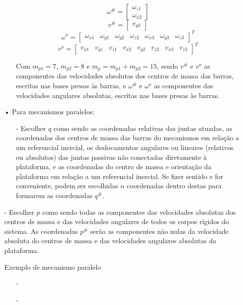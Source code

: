 \documentclass[12pt,a4paper]{article}
\begin{document}
\begin{itemize}
\begin{itemize}
$$ \omega^{\#} = \begin{bmatrix}
\omega_{z1} \\
\omega_{x2}
\end{bmatrix} $$
$$ v^{\#} = \begin{bmatrix}
v_{y3}
\end{bmatrix} $$
$$ \omega^o = \begin{bmatrix}
\omega_{x1} & \omega_{y1} & \omega_{y2} & \omega_{z2} & \omega_{x3} & \omega_{y3} & \omega_{z3}
\end{bmatrix}^T $$
$$ v^o = \begin{bmatrix}
v_{x1} & v_{y1} & v_{z1} & v_{x2} & v_{y2} & v_{z2} & v_{x3} & v_{z3}
\end{bmatrix}^T $$

Com $m_{p1} = 7$, $m_{p2} = 8$ e $m_p = m_{p1} + m_{p2} = 15$, sendo $v^{\#}$ e $v^o$ as componentes das velocidades absolutas dos centros de massa das barras, escritas nas bases presas às barras, e $\omega^{\#}$ e $\omega^o$ as componentes das velocidades angulares absolutas, escritas nas bases presas às barras.

\end{itemize}


\item[•] Para mecanismos paralelos:

\begin{itemize}
	\item[-] Escolher $q$ como sendo as coordenadas relativas das juntas atuadas, as coordenadas dos centros de massa das barras do mecanismos em relação a um referencial inercial, os deslocamentos angulares ou lineares (relativos ou absolutos) das juntas passivas não conectadas diretamente à plataforma, e as coordenadas do centro de massa e orientação da plataforma em relação a um referencial inercial. Se fizer sentido e for conveniente, podem ser escolhidas $n$ coordenadas dentro destas para formarem as coordenadas $q^{\#}$.
\end{itemize}

	\item[-] Escolher $p$ como sendo todas as componentes das velocidades absolutas dos centros de massa e das velocidades angulares de todos os corpos rígidos do sistema. As coordenadas $p^{\#}$ serão as componentes não nulas da velocidade absoluta do centros de massa e das velocidades angulares absolutas da plataforma. 




Exemplo de mecanismo paralelo

\begin{itemize}
\item[-]
\item[-]
\end{itemize}

\end{itemize}
\end{document}
